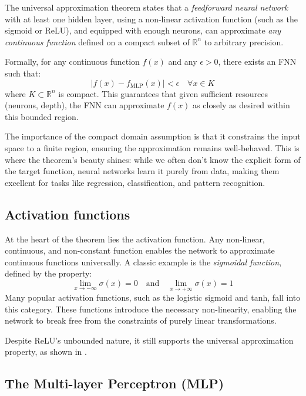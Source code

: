 \documentclass{article}
\theoremstyle{definition}
\theoremstyle{remark}
\begin{document}
The universal approximation theorem states that a \textit{feedforward neural network} with at least one hidden layer, using a non-linear activation function (such as the sigmoid or ReLU), and equipped with enough neurons, can approximate \textit{any continuous function} defined on a compact subset of \(\mathbb{R}^n\) to arbitrary precision.

Formally, for any continuous function \(f(x)\) and any \(\epsilon > 0\), there exists an FNN such that:
\[
| f(x) - f_{\text{MLP}}(x) | < \epsilon \quad \forall x \in K
\]
where \(K \subset \mathbb{R}^n\) is compact. This guarantees that given sufficient resources (neurons, depth), the FNN can approximate \(f(x)\) as closely as desired within this bounded region.

The importance of the compact domain assumption is that it constrains the input space to a finite region, ensuring the approximation remains well-behaved.
This is where the theorem’s beauty shines: while we often don’t know the explicit form of the target function, neural networks learn it purely from data, making them excellent for tasks like regression, classification, and pattern recognition.



\subsection{Activation functions} %
At the heart of the theorem lies the activation function. Any non-linear, continuous, and non-constant function enables the network to approximate continuous functions universally.
A classic example is the \textit{sigmoidal function}, defined by the property:
\[
\lim_{x \to -\infty} \sigma(x) = 0 \quad \text{and} \quad \lim_{x \to +\infty} \sigma(x) = 1
\]
Many popular activation functions, such as the logistic sigmoid and tanh, fall into this category.
These functions introduce the necessary non-linearity, enabling the network to break free from the constraints of purely linear transformations.

Despite ReLU's unbounded nature, it still supports the universal approximation property, as shown in \citep{yarotsky2017error}.



\subsection{The Multi-layer Perceptron (MLP)}
\end{document}
